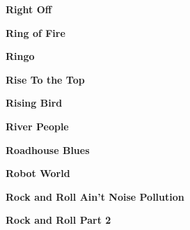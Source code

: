 \vspace{10pt} 
\begin{center}\textbf{Right Off}\end{center}
\newline
\vspace{10pt} 
\begin{center}\textbf{Ring of Fire}\end{center}
\newline
\vspace{10pt} 
\begin{center}\textbf{Ringo}\end{center}
\newline
\vspace{10pt} 
\begin{center}\textbf{Rise To the Top}\end{center}
\newline
\vspace{10pt} 
\begin{center}\textbf{Rising Bird}\end{center}
\newline
\vspace{10pt} 
\begin{center}\textbf{River People}\end{center}
\newline
\vspace{10pt} 
\begin{center}\textbf{Roadhouse Blues}\end{center}
\newline
\vspace{10pt} 
\begin{center}\textbf{Robot World}\end{center}
\newline
\vspace{10pt} 
\begin{center}\textbf{Rock and Roll Ain't Noise Pollution}\end{center}
\newline
\vspace{10pt} 
\begin{center}\textbf{Rock and Roll Part 2}\end{center}
